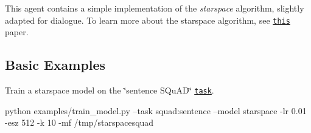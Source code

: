 This agent contains a simple implementation of the {\itshape starspace} algorithm, slightly adapted for dialogue. To learn more about the starspace algorithm, see \href{https://arxiv.org/abs/1709.03856}{\tt this} paper.

\subsection*{Basic Examples}

Train a starspace model on the \char`\"{}sentence S\+Qu\+A\+D\char`\"{} \href{https://github.com/facebookresearch/ParlAI/blob/master/parlai/tasks/squad/agents.py}{\tt task}. 
\begin{DoxyCode}
python examples/train\_model.py --task squad:sentence --model starspace -lr 0.01 -esz 512 -k 10 -mf
       /tmp/starspacesquad
\end{DoxyCode}
 